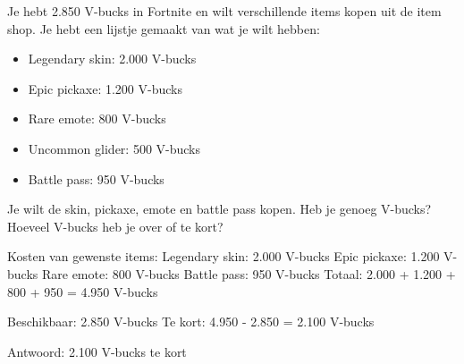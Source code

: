 \begin{opgave}
Je hebt 2.850 V-bucks in Fortnite en wilt verschillende items kopen uit de item shop.
Je hebt een lijstje gemaakt van wat je wilt hebben:

\begin{itemize}
\item Legendary skin: 2.000 V-bucks
\item Epic pickaxe: 1.200 V-bucks
\item Rare emote: 800 V-bucks
\item Uncommon glider: 500 V-bucks
\item Battle pass: 950 V-bucks
\end{itemize}

Je wilt de skin, pickaxe, emote en battle pass kopen. Heb je genoeg V-bucks?
Hoeveel V-bucks heb je over of te kort?
\end{opgave}

\begin{oplossing}
Kosten van gewenste items:
Legendary skin: 2.000 V-bucks
Epic pickaxe: 1.200 V-bucks
Rare emote: 800 V-bucks
Battle pass: 950 V-bucks
Totaal: 2.000 + 1.200 + 800 + 950 = 4.950 V-bucks

Beschikbaar: 2.850 V-bucks
Te kort: 4.950 - 2.850 = 2.100 V-bucks

Antwoord: 2.100 V-bucks te kort
\end{oplossing}